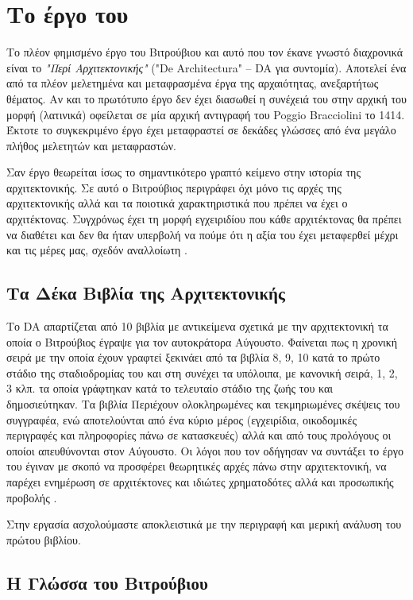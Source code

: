 \section{Το έργο του} 

Το πλέον φημισμένο έργο του Βιτρούβιου και αυτό που τον έκανε γνωστό διαχρονικά είναι το \emph{"Περί Αρχιτεκτονικής"} ("De Architectura" -- DA για συντομία). Aποτελεί ένα από τα πλέον μελετημένα και μεταφρασμένα έργα της αρχαιότητας, ανεξαρτήτως θέματος. Αν και το πρωτότυπο έργο δεν έχει διασωθεί η συνέχειά του στην αρχική του μορφή (λατινικά) οφείλεται σε μία αρχική αντιγραφή του Poggio Bracciolini το 1414. Έκτοτε το συγκεκριμένο έργο έχει μεταφραστεί σε δεκάδες γλώσσες από ένα μεγάλο πλήθος μελετητών και μεταφραστών.

Σαν έργο θεωρείται ίσως το σημαντικότερο γραπτό κείμενο στην ιστορία της αρχιτεκτονικής. Σε αυτό ο Βιτρούβιος περιγράφει όχι μόνο τις αρχές της αρχιτεκτονικής αλλά και τα ποιοτικά χαρακτηριστικά που πρέπει να έχει ο αρχιτέκτονας. Συγχρόνως έχει τη μορφή εγχειριδίου που κάθε αρχιτέκτονας θα πρέπει να διαθέτει και δεν θα ήταν υπερβολή να πούμε ότι η αξία του έχει μεταφερθεί μέχρι και τις μέρες μας, σχεδόν αναλλοίωτη \cite[σ. 16-18]{vitruvius-lefas}.

\subsection{Τα Δέκα Βιβλία της Αρχιτεκτονικής}

Το DA απαρτίζεται από 10 βιβλία με αντικείμενα σχετικά με την αρχιτεκτονική τα οποία ο Βιτρούβιος έγραψε για τον αυτοκράτορα Αύγουστο. Φαίνεται πως η χρονική σειρά με την οποία έχουν γραφτεί ξεκινάει από τα βιβλία 8, 9, 10 κατά το πρώτο στάδιο της σταδιοδρομίας του και στη συνέχει τα υπόλοιπα, με κανονική σειρά, 1, 2, 3 κλπ. τα οποία γράφτηκαν κατά το τελευταίο στάδιο της ζωής του και δημοσιεύτηκαν. Τα βιβλία Περιέχουν ολοκληρωμένες και τεκμηριωμένες σκέψεις του συγγραφέα, ενώ αποτελούνται από ένα κύριο μέρος (εγχειρίδια, οικοδομικές περιγραφές και πληροφορίες πάνω σε κατασκευές) αλλά και από τους προλόγους οι οποίοι απευθύνονται στον Αύγουστο. Οι λόγοι που τον οδήγησαν να συντάξει το έργο του έγιναν με σκοπό να προσφέρει θεωρητικές αρχές πάνω στην αρχιτεκτονική, να παρέχει ενημέρωση σε αρχιτέκτονες και ιδιώτες χρηματοδότες αλλά και προσωπικής προβολής \cite{vitruvius-lefas}.

Στην εργασία ασχολούμαστε αποκλειστικά με την περιγραφή και μερική ανάλυση του πρώτου βιβλίου. 

\subsection{Η Γλώσσα του Βιτρούβιου}


